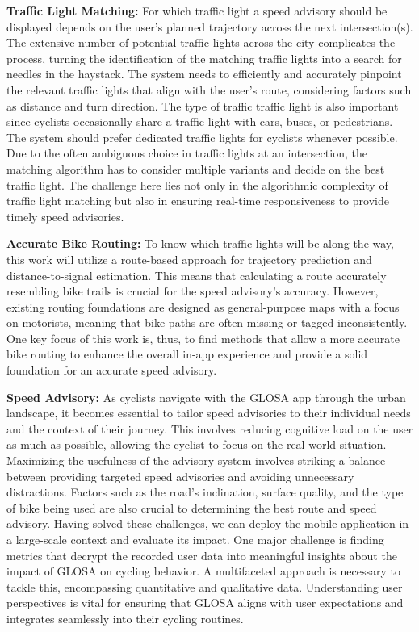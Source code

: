 \textbf{\color{cidarkblue}Traffic Light Matching:} For which traffic light a speed advisory should be displayed depends on the user's planned trajectory across the next intersection(s). The extensive number of potential traffic lights across the city complicates the process, turning the identification of the matching traffic lights into a search for needles in the haystack. The system needs to efficiently and accurately pinpoint the relevant traffic lights that align with the user's route, considering factors such as distance and turn direction. The type of traffic traffic light is also important since cyclists occasionally share a traffic light with cars, buses, or pedestrians. The system should prefer dedicated traffic lights for cyclists whenever possible. Due to the often ambiguous choice in traffic lights at an intersection, the matching algorithm has to consider multiple variants and decide on the best traffic light. The challenge here lies not only in the algorithmic complexity of traffic light matching but also in ensuring real-time responsiveness to provide timely speed advisories.

\textbf{\color{cidarkblue}Accurate Bike Routing:} To know which traffic lights will be along the way, this work will utilize a route-based approach for trajectory prediction and distance-to-signal estimation. This means that calculating a route accurately resembling bike trails is crucial for the speed advisory's accuracy. However, existing routing foundations are designed as general-purpose maps with a focus on motorists, meaning that bike paths are often missing or tagged inconsistently. One key focus of this work is, thus, to find methods that allow a more accurate bike routing to enhance the overall in-app experience and provide a solid foundation for an accurate speed advisory.

\textbf{\color{cidarkblue}Speed Advisory:} As cyclists navigate with the GLOSA app through the urban landscape, it becomes essential to tailor speed advisories to their individual needs and the context of their journey. This involves reducing cognitive load on the user as much as possible, allowing the cyclist to focus on the real-world situation. Maximizing the usefulness of the advisory system involves striking a balance between providing targeted speed advisories and avoiding unnecessary distractions. Factors such as the road's inclination, surface quality, and the type of bike being used are also crucial to determining the best route and speed advisory. Having solved these challenges, we can deploy the mobile application in a large-scale context and evaluate its impact. One major challenge is finding metrics that decrypt the recorded user data into meaningful insights about the impact of GLOSA on cycling behavior. A multifaceted approach is necessary to tackle this, encompassing quantitative and qualitative data. Understanding user perspectives is vital for ensuring that GLOSA aligns with user expectations and integrates seamlessly into their cycling routines. 

